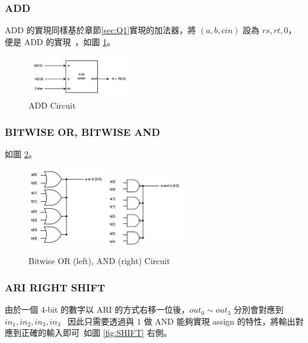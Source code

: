 \documentclass[10.5pt,compsoc,UTF8]{CjC}
\theoremstyle{mystyle}
\begin{document}
\subsubsection*{ADD}
ADD 的實現同樣基於章節\ref{sec:Q1}實現的加法器，將 $(a, b, cin)$ 設為 $rs, rt, 0$，便是 ADD 的實現\
，如圖 \ref{fig:ADD}。

\begin{figure}[htp]
  \centering
  \includegraphics[width=0.4\textwidth]{ADD.png}
  \caption{ADD Circuit}
  \label{fig:ADD}
\end{figure}

\newpage

\subsubsection*{BITWISE OR, BITWISE AND}
如圖 \ref{fig:OR-AND}。

\begin{figure}[htp]
  \centering
  \includegraphics[width=0.3\textwidth]{BITOR.png}
  \includegraphics[width=0.3\textwidth]{BITAND.png}
  \caption{Bitwise OR (left), AND (right) Circuit}
  \label{fig:OR-AND}
\end{figure}

\subsubsection*{ARI RIGHT SHIFT}
由於一個 4-bit 的數字以 ARI 的方式右移一位後，$out_0 \sim out_3$ 分別會對應到 $in_1, in_2, in_3, in_3$ \
因此只需要透過與 $1$ 做 AND 能夠實現 assign 的特性，將輸出對應到正確的輸入即可\
如圖 \ref{fig:SHIFT} 右側。
\end{document}
